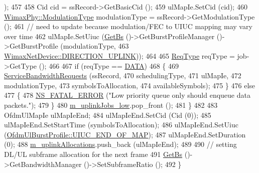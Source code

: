 \begin{DoxyCode}
      );
457 
458       Cid cid = ssRecord->GetBasicCid ();
459       ulMapIe.SetCid (cid);
460       \hyperlink{classns3_1_1WimaxPhy_a044c5d8a48ca992c39c2a946f6e755fa}{WimaxPhy::ModulationType} modulationType = ssRecord->GetModulationType ();
461       \textcolor{comment}{// need to update because modulation/FEC to UIUC mapping may vary over time}
462       ulMapIe.SetUiuc (\hyperlink{classns3_1_1UplinkScheduler_afe61b7de71d92d2dff1b135744a6ff7e}{GetBs} ()->GetBurstProfileManager ()->GetBurstProfile (modulationType,
463                                                                              
      \hyperlink{classns3_1_1WimaxNetDevice_a194b6cf7eb59582328eb2531dc9ed884ad37a477621d1df190ff8d8fb933349cd}{WimaxNetDevice::DIRECTION\_UPLINK}));
464 
465       \hyperlink{namespacens3_a534f9a14e4d9aeb5b400e61f152a73a2}{ReqType} reqType = job->GetType ();
466 
467       \textcolor{keywordflow}{if} (reqType == \hyperlink{namespacens3_a534f9a14e4d9aeb5b400e61f152a73a2ae87e0f8f47d5619e16355b1f8caca558}{DATA})
468         \{
469           \hyperlink{classns3_1_1UplinkSchedulerMBQoS_a2405968bd60de182ce1e3d67ae416ba7}{ServiceBandwidthRequests} (ssRecord,
470                                     schedulingType,
471                                     ulMapIe,
472                                     modulationType,
473                                     symbolsToAllocation,
474                                     availableSymbols);
475         \}
476       \textcolor{keywordflow}{else}
477         \{
478           \hyperlink{group__fatal_ga5131d5e3f75d7d4cbfd706ac456fdc85}{NS\_FATAL\_ERROR} (\textcolor{stringliteral}{"Low priority queue only should enqueue data packets."});
479         \}
480       \hyperlink{classns3_1_1UplinkSchedulerMBQoS_a73b59113ed20a512685dc76e93cf1faa}{m\_uplinkJobs\_low}.pop\_front ();
481     \}
482 
483   OfdmUlMapIe ulMapIeEnd;
484   ulMapIeEnd.SetCid (Cid (0));
485   ulMapIeEnd.SetStartTime (symbolsToAllocation);
486   ulMapIeEnd.SetUiuc (\hyperlink{classns3_1_1OfdmUlBurstProfile_ae528783c4b3c6700ff49dfd7a555cb3dabef491e8d426af16beba1541b947b7e9}{OfdmUlBurstProfile::UIUC\_END\_OF\_MAP});
487   ulMapIeEnd.SetDuration (0);
488   \hyperlink{classns3_1_1UplinkSchedulerMBQoS_afdca0f835bd9f2b31ad19a7a2a2f4382}{m\_uplinkAllocations}.push\_back (ulMapIeEnd);
489 
490   \textcolor{comment}{// setting DL/UL subframe allocation for the next frame}
491   \hyperlink{classns3_1_1UplinkScheduler_afe61b7de71d92d2dff1b135744a6ff7e}{GetBs} ()->GetBandwidthManager ()->SetSubframeRatio ();
492 \}
\end{DoxyCode}


